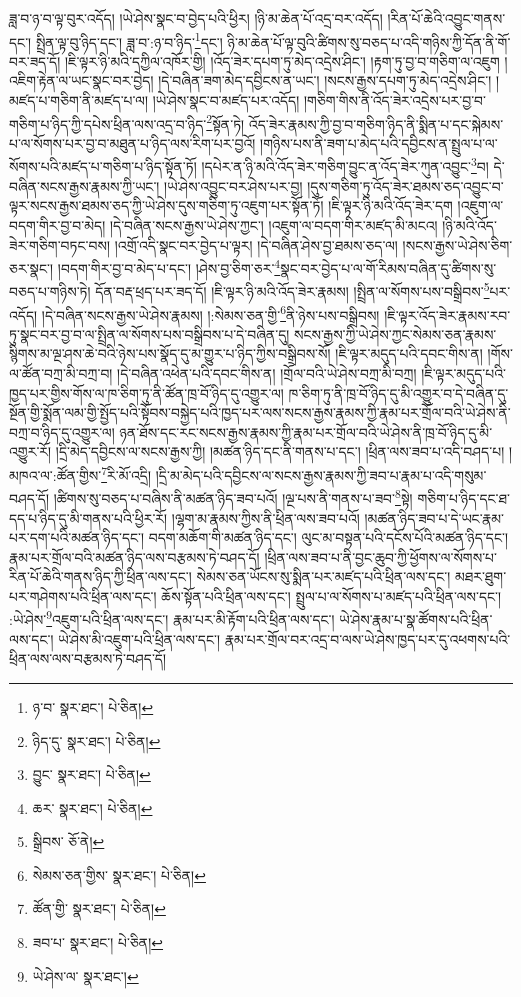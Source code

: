 ཟླ་བ་ཉ་བ་ལྟ་བུར་འདོད། །ཡེ་ཤེས་སྣང་བ་བྱེད་པའི་ཕྱིར། །ཉི་མ་ཆེན་པོ་འདྲ་བར་འདོད། །རིན་པོ་ཆེའི་འབྱུང་གནས་དང་། སྤྲིན་ལྟ་བུ་ཉིད་དང་། ཟླ་བ་:ཉ་བ་ཉིད་\footnote{ཉ་བ་  སྣར་ཐང་།  པེ་ཅིན། }དང་། ཉི་མ་ཆེན་པོ་ལྟ་བུའི་ཚིགས་སུ་བཅད་པ་འདི་གཉིས་ཀྱི་དོན་ནི་གོ་བར་ཟད་དོ། །ཇི་ལྟར་ཉི་མའི་དཀྱིལ་འཁོར་གྱི། །འོད་ཟེར་དཔག་ཏུ་མེད་འདྲེས་ཤིང་། །རྟག་ཏུ་བྱ་བ་གཅིག་ལ་འཇུག །འཇིག་རྟེན་ལ་ཡང་སྣང་བར་བྱེད། །དེ་བཞིན་ཟག་མེད་དབྱིངས་ན་ཡང་། །སངས་རྒྱས་དཔག་ཏུ་མེད་འདྲེས་ཤིང་། །མཛད་པ་གཅིག་ནི་མཛད་པ་ལ། །ཡེ་ཤེས་སྣང་བ་མཛད་པར་འདོད། །གཅིག་གིས་ནི་འོད་ཟེར་འདྲེས་པར་བྱ་བ་གཅིག་པ་ཉིད་ཀྱི་དཔེས་ཕྲིན་ལས་འདྲ་བ་ཉིད་\footnote{ཉིད་དུ་  སྣར་ཐང་།  པེ་ཅིན། }སྟོན་ཏེ། འོད་ཟེར་རྣམས་ཀྱི་བྱ་བ་གཅིག་ཉིད་ནི་སྨིན་པ་དང་སྐེམས་པ་ལ་སོགས་པར་བྱ་བ་མཐུན་པ་ཉིད་ལས་རིག་པར་བྱའོ། །གཉིས་པས་ནི་ཟག་པ་མེད་པའི་དབྱིངས་ན་སྤྲུལ་པ་ལ་སོགས་པའི་མཛད་པ་གཅིག་པ་ཉིད་སྟོན་ཏོ། །དཔེར་ན་ཉི་མའི་འོད་ཟེར་གཅིག་བྱུང་ན་འོད་ཟེར་ཀུན་འབྱུང་\footnote{བྱུང་  སྣར་ཐང་།  པེ་ཅིན། }བ། དེ་བཞིན་སངས་རྒྱས་རྣམས་ཀྱི་ཡང་། །ཡེ་ཤེས་འབྱུང་བར་ཤེས་པར་བྱ། །དུས་གཅིག་ཏུ་འོད་ཟེར་ཐམས་ཅད་འབྱུང་བ་ལྟར་སངས་རྒྱས་ཐམས་ཅད་ཀྱི་ཡེ་ཤེས་དུས་གཅིག་ཏུ་འཇུག་པར་སྟོན་ཏོ། །ཇི་ལྟར་ཉི་མའི་འོད་ཟེར་དག །འཇུག་ལ་བདག་གིར་བྱ་བ་མེད། །དེ་བཞིན་སངས་རྒྱས་ཡེ་ཤེས་ཀྱང་། །འཇུག་ལ་བདག་གིར་མཛད་མི་མངའ། །ཉི་མའི་འོད་ཟེར་གཅིག་བཏང་བས། །འགྲོ་འདི་སྣང་བར་བྱེད་པ་ལྟར། །དེ་བཞིན་ཤེས་བྱ་ཐམས་ཅད་ལ། །སངས་རྒྱས་ཡེ་ཤེས་ཅིག་ཅར་སྣང་། །བདག་གིར་བྱ་བ་མེད་པ་དང་། །ཤེས་བྱ་ཅིག་ཅར་\footnote{ཆར་  སྣར་ཐང་།  པེ་ཅིན། }སྣང་བར་བྱེད་པ་ལ་གོ་རིམས་བཞིན་དུ་ཚིགས་སུ་བཅད་པ་གཉིས་ཏེ། དོན་བརྡ་ཕྲད་པར་ཟད་དོ། །ཇི་ལྟར་ཉི་མའི་འོད་ཟེར་རྣམས། །སྤྲིན་ལ་སོགས་པས་བསྒྲིབས་\footnote{སྒྲིབས་  ཅོ་ནེ། }པར་འདོད། །དེ་བཞིན་སངས་རྒྱས་ཡེ་ཤེས་རྣམས། །:སེམས་ཅན་གྱི་\footnote{སེམས་ཅན་གྱིས་  སྣར་ཐང་།  པེ་ཅིན། }ནི་ཉེས་པས་བསྒྲིབས། །ཇི་ལྟར་འོད་ཟེར་རྣམས་རབ་ཏུ་སྣང་བར་བྱ་བ་ལ་སྤྲིན་ལ་སོགས་པས་བསྒྲིབས་པ་དེ་བཞིན་དུ། སངས་རྒྱས་ཀྱི་ཡེ་ཤེས་ཀྱང་སེམས་ཅན་རྣམས་སྙིགས་མ་ལྔ་ཤས་ཆེ་བའི་ཉེས་པས་སྣོད་དུ་མ་གྱུར་པ་ཉིད་ཀྱིས་བསྒྲིབས་སོ། །ཇི་ལྟར་མདུད་པའི་དབང་གིས་ན། །གོས་ལ་ཚོན་བཀྲ་མི་བཀྲ་བ། །དེ་བཞིན་འཕེན་པའི་དབང་གིས་ན། །གྲོལ་བའི་ཡེ་ཤེས་བཀྲ་མི་བཀྲ། །ཇི་ལྟར་མདུད་པའི་ཁྱད་པར་གྱིས་གོས་ལ་ཁ་ཅིག་ཏུ་ནི་ཚོན་ཁྲ་བོ་ཉིད་དུ་འགྱུར་ལ། ཁ་ཅིག་ཏུ་ནི་ཁྲ་བོ་ཉིད་དུ་མི་འགྱུར་བ་དེ་བཞིན་དུ་སྔོན་གྱི་སྨོན་ལམ་གྱི་སྤྱོད་པའི་སྟོབས་བསྐྱེད་པའི་ཁྱད་པར་ལས་སངས་རྒྱས་རྣམས་ཀྱི་རྣམ་པར་གྲོལ་བའི་ཡེ་ཤེས་ནི་བཀྲ་བ་ཉིད་དུ་འགྱུར་ལ། ཉན་ཐོས་དང་རང་སངས་རྒྱས་རྣམས་ཀྱི་རྣམ་པར་གྲོལ་བའི་ཡེ་ཤེས་ནི་ཁྲ་བོ་ཉིད་དུ་མི་འགྱུར་རོ། །དྲི་མེད་དབྱིངས་ལ་སངས་རྒྱས་ཀྱི། །མཚན་ཉིད་དང་ནི་གནས་པ་དང་། །ཕྲིན་ལས་ཟབ་པ་འདི་བཤད་པ། །མཁའ་ལ་:ཚོན་གྱིས་\footnote{ཚོན་གྱི་  སྣར་ཐང་།  པེ་ཅིན། }རི་མོ་འདྲི། །དྲི་མ་མེད་པའི་དབྱིངས་ལ་སངས་རྒྱས་རྣམས་ཀྱི་ཟབ་པ་རྣམ་པ་འདི་གསུམ་བཤད་དོ། །ཚིགས་སུ་བཅད་པ་བཞིས་ནི་མཚན་ཉིད་ཟབ་པའོ། །ལྔ་པས་ནི་གནས་པ་ཟབ་\footnote{ཟབ་པ་  སྣར་ཐང་།  པེ་ཅིན། }སྟེ། གཅིག་པ་ཉིད་དང་ཐ་དད་པ་ཉིད་དུ་མི་གནས་པའི་ཕྱིར་རོ། །ལྷག་མ་རྣམས་ཀྱིས་ནི་ཕྲིན་ལས་ཟབ་པའོ། །མཚན་ཉིད་ཟབ་པ་དེ་ཡང་རྣམ་པར་དག་པའི་མཚན་ཉིད་དང་། བདག་མཆོག་གི་མཚན་ཉིད་དང་། ལུང་མ་བསྟན་པའི་དངོས་པོའི་མཚན་ཉིད་དང་། རྣམ་པར་གྲོལ་བའི་མཚན་ཉིད་ལས་བརྩམས་ཏེ་བཤད་དོ། །ཕྲིན་ལས་ཟབ་པ་ནི་བྱང་ཆུབ་ཀྱི་ཕྱོགས་ལ་སོགས་པ་རིན་པོ་ཆེའི་གནས་ཉིད་ཀྱི་ཕྲིན་ལས་དང་། སེམས་ཅན་ཡོངས་སུ་སྨིན་པར་མཛད་པའི་ཕྲིན་ལས་དང་། མཐར་ཐུག་པར་གཤེགས་པའི་ཕྲིན་ལས་དང་། ཆོས་སྟོན་པའི་ཕྲིན་ལས་དང་། སྤྲུལ་པ་ལ་སོགས་པ་མཛད་པའི་ཕྲིན་ལས་དང་། :ཡེ་ཤེས་\footnote{ཡེ་ཤེས་ལ་  སྣར་ཐང་། }འཇུག་པའི་ཕྲིན་ལས་དང་། རྣམ་པར་མི་རྟོག་པའི་ཕྲིན་ལས་དང་། ཡེ་ཤེས་རྣམ་པ་སྣ་ཚོགས་པའི་ཕྲིན་ལས་དང་། ཡེ་ཤེས་མི་འཇུག་པའི་ཕྲིན་ལས་དང་། རྣམ་པར་གྲོལ་བར་འདྲ་བ་ལས་ཡེ་ཤེས་ཁྱད་པར་དུ་འཕགས་པའི་ཕྲིན་ལས་ལས་བརྩམས་ཏེ་བཤད་དོ། 